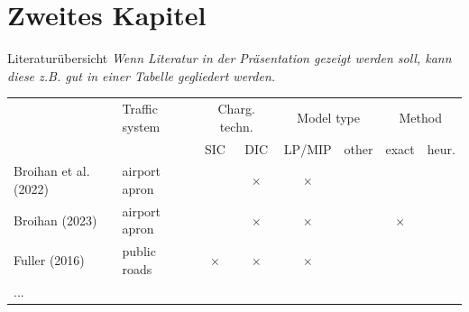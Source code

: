 
\section{Zweites Kapitel}

\begin{frame}{Literaturübersicht}
\textit{Wenn Literatur in der Präsentation gezeigt werden soll, kann diese z.B. gut in einer Tabelle gegliedert werden.}
\begin{table}[!ht]
	\begin{tabular}{p{4cm} lcccccc}\hline
			& Traffic system & \multicolumn{2}{c}{Charg. techn.} & \multicolumn{2}{c}{Model type}& \multicolumn{2}{c}{Method}\\ 
			&& SIC & DIC & LP/MIP & other & exact & heur. \\ \hline		
		Broihan et al. (2022) & airport apron & & $\times$ & $\times$ \\
		Broihan (2023) & airport apron & & $\times$ & $\times$ &&$\times$ \\
		Fuller (2016) & public roads & $\times$ & $\times$ & $\times$ \\
		...\\
	\end{tabular}
\end{table}
\end{frame}

